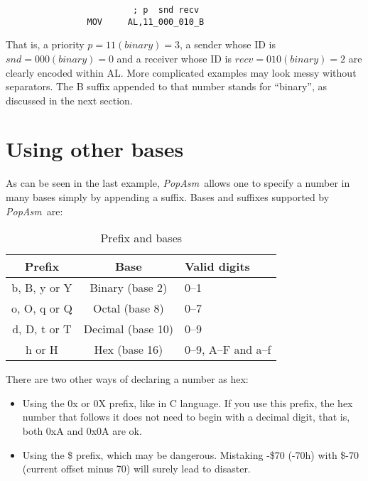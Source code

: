 \documentclass[a4paper,12pt]{book}
\newcommand{\popasm}{\emph{PopAsm}}
\begin{document}
\begin{verbatim}
                         ; p  snd recv
                MOV     AL,11_000_010_B
\end{verbatim}

That is, a priority $p = 11 (binary) = 3$, a sender whose ID is $snd
= 000 (binary) = 0$ and a receiver whose ID is $recv = 010 (binary)
= 2$ are clearly encoded within AL. More complicated examples may
look messy without separators. The B suffix appended to that
number stands for ``binary'', as discussed in the next section.

\section{Using other bases}
As can be seen in the last example, \popasm\ allows one to specify a
number in many bases simply by appending a suffix. Bases and suffixes
supported by \popasm\ are:

\begin{table}[h]
\begin{center}
\begin{tabular}[h]{ccl}
Prefix & Base & Valid digits\\
\hline
b, B, y or Y & Binary (base 2)  & 0--1 \\
o, O, q or Q & Octal (base 8)  & 0--7 \\
d, D, t or T & Decimal (base 10)  & 0--9 \\
h or H & Hex (base 16)  & 0--9, A--F and a--f\protect{\footnotemark}\\
\hline
\end{tabular}
\caption{Prefix and bases}
\end{center}
\end{table}


There are two other ways of declaring a number as hex:

\begin{itemize}
\item{Using the 0x or 0X prefix}, like in C language. If you use this
   prefix, the hex number that follows it does not need to begin with
   a decimal digit, that is, both 0xA and 0x0A are ok.
\item{Using the \$ prefix}, which may be dangerous. Mistaking -\$70 (-70h)
   with \$-70 (current offset minus 70) will surely lead to disaster.
\end{itemize}
\end{document}
